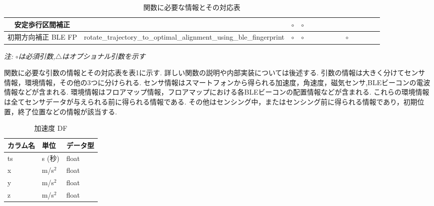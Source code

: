 \begin{table}[ht]
{\begin{tabular}{|c|c|c|c|c|c|c|c|c|c|c|c|c|c|}
			安定歩行区間補正      &                                                                     & \multicolumn{1}{c|}{$\circ$} & \multicolumn{1}{c|}{$\circ$} &                              &                              &                              &                                                                                                               &                              &                           &                                  &    &                              &    \\ \hline
			初期方向補正 BLE FP & rotate\_trajectory\_to\_optimal\_alignment\_using\_ble\_fingerprint
			              & \multicolumn{1}{c|}{$\circ$}                                        & \multicolumn{1}{c|}{$\circ$} &                              &                              &                              &                              &                                                                                                               & \multicolumn{1}{c|}{$\circ$} &                           &                                  &    &                                   \\ \hline
		\end{tabular}
	}
	\caption{関数に必要な情報とその対応表} \label{}
	\textit{注: $\circ$は必須引数,$\triangle$はオプショナル引数を示す} \label{tab:my_label}
\end{table}


関数に必要な引数の情報とその対応表を表1に示す.
詳しい関数の説明や内部実装については後述する.
引数の情報は大きく分けてセンサ情報，環境情報，その他の3つに分けられる.
センサ情報はスマートフォンから得られる加速度，角速度，磁気センサ,BLEビーコンの電波情報などが含まれる.
環境情報はフロアマップ情報，フロアマップにおける各BLEビーコンの配置情報などが含まれる.
これらの環境情報は全てセンサデータが与えられる前に得られる情報である.
その他はセンシング中，またはセンシング前に得られる情報であり，初期位置，終了位置などの情報が該当する.


\begin{table}[ht]
	\centering
	\begin{tabular}{lll}
		\toprule
		カラム名 & 単位        & データ型  \\
		\midrule
		ts   & s (秒)     & float \\
		x    & m/s\(^2\) & float \\
		y    & m/s\(^2\) & float \\
		z    & m/s\(^2\) & float \\
		\bottomrule
	\end{tabular}
	\caption{加速度 DF}
\end{table}


